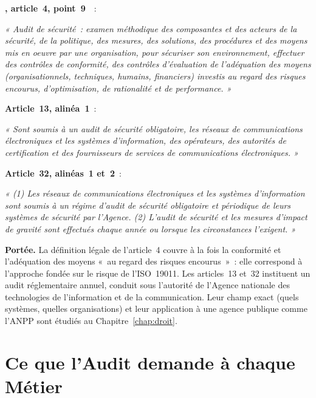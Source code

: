 \begin{boxjuris}
\textbf{, article~4, point~9}~\cite{loi2010012}~:

\medskip
\textit{« Audit de sécurité~: examen méthodique des composantes et des
acteurs de la sécurité, de la politique, des mesures, des solutions, des
procédures et des moyens mis en oeuvre par une organisation, pour
sécuriser son environnement, effectuer des contrôles de conformité, des
contrôles d'évaluation de l'adéquation des moyens (organisationnels,
techniques, humains, financiers) investis au regard des risques encourus,
d'optimisation, de rationalité et de performance. »}

\medskip
\textbf{Article~13, alinéa~1}~:

\medskip
\textit{« Sont soumis à un audit de sécurité obligatoire, les réseaux de
communications électroniques et les systèmes d'information, des
opérateurs, des autorités de certification et des fournisseurs de services
de communications électroniques. »}

\medskip
\textbf{Article~32, alinéas~1 et~2}~:

\medskip
\textit{« (1) Les réseaux de communications électroniques et les systèmes
d'information sont soumis à un régime d'audit de sécurité obligatoire et
périodique de leurs systèmes de sécurité par l'Agence. (2) L'audit de
sécurité et les mesures d'impact de gravité sont effectués chaque année ou
lorsque les circonstances l'exigent. »}

\medskip
\textbf{Portée.} La définition légale de l'article~4 couvre à la fois la
conformité et l'adéquation des moyens «~au regard des risques encourus~»~:
elle correspond à l'approche fondée sur le risque de l'ISO~19011. Les
articles~13 et~32 instituent un audit réglementaire annuel, conduit sous
l'autorité de l'Agence nationale des technologies de l'information et de la
communication. Leur champ exact (quels systèmes, quelles organisations)
et leur application à une agence publique comme l'ANPP sont étudiés au
Chapitre~\ref{chap:droit}.
\end{boxjuris}

\section{Ce que l'Audit demande à chaque Métier}
\label{sec:c06-metiers}

